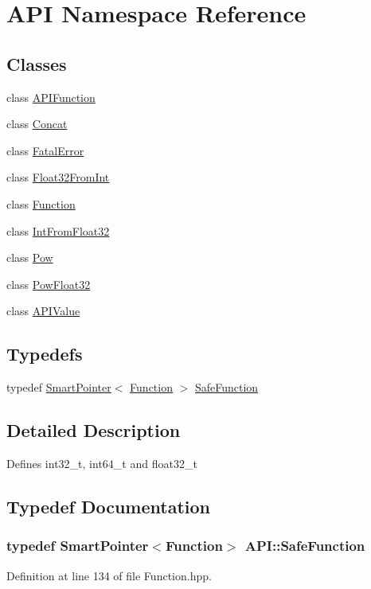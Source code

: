 \hypertarget{namespace_a_p_i}{\section{A\-P\-I Namespace Reference}
\label{namespace_a_p_i}
}
\subsection*{Classes}
\begin{DoxyCompactItemize}
\item 
class \hyperlink{class_a_p_i_1_1_a_p_i_function}{A\-P\-I\-Function}
\item 
class \hyperlink{class_a_p_i_1_1_concat}{Concat}
\item 
class \hyperlink{class_a_p_i_1_1_fatal_error}{Fatal\-Error}
\item 
class \hyperlink{class_a_p_i_1_1_float32_from_int}{Float32\-From\-Int}
\item 
class \hyperlink{class_a_p_i_1_1_function}{Function}
\item 
class \hyperlink{class_a_p_i_1_1_int_from_float32}{Int\-From\-Float32}
\item 
class \hyperlink{class_a_p_i_1_1_pow}{Pow}
\item 
class \hyperlink{class_a_p_i_1_1_pow_float32}{Pow\-Float32}
\item 
class \hyperlink{class_a_p_i_1_1_a_p_i_value}{A\-P\-I\-Value}
\end{DoxyCompactItemize}
\subsection*{Typedefs}
\begin{DoxyCompactItemize}
\item 
typedef \hyperlink{_smart_pointer_8hpp_afdd8d4ba81c3fcbdeacf1dafba2accfb}{Smart\-Pointer}$<$ \hyperlink{class_a_p_i_1_1_function}{Function} $>$ \hyperlink{namespace_a_p_i_a45cf1fb9660efbbc53fb7634b0cbd25f}{Safe\-Function}
\end{DoxyCompactItemize}


\subsection{Detailed Description}
Defines int32\-\_\-t, int64\-\_\-t and float32\-\_\-t 

\subsection{Typedef Documentation}
\hypertarget{namespace_a_p_i_a45cf1fb9660efbbc53fb7634b0cbd25f}{
\subsubsection[{Safe\-Function}]{\setlength{\rightskip}{0pt plus 5cm}typedef {\bf Smart\-Pointer}$<${\bf Function}$>$ {\bf A\-P\-I\-::\-Safe\-Function}}}\label{namespace_a_p_i_a45cf1fb9660efbbc53fb7634b0cbd25f}


Definition at line 134 of file Function.\-hpp.

